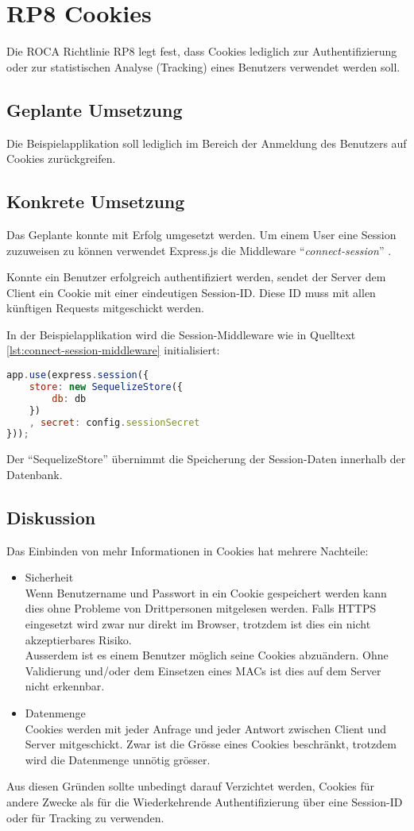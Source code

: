 \section{RP8 Cookies}
\label{sec:principle-rp8-cookies}
Die ROCA Richtlinie RP8 legt fest, dass Cookies lediglich zur Authentifizierung oder zur statistischen Analyse (Tracking) eines Benutzers verwendet werden soll.

\subsection*{Geplante Umsetzung}
Die Beispielapplikation soll lediglich im Bereich der Anmeldung des Benutzers auf Cookies zurückgreifen.

\subsection*{Konkrete Umsetzung}
Das Geplante konnte mit Erfolg umgesetzt werden.
Um einem User eine Session zuzuweisen zu können verwendet Express.js \cite{Expressjs} die \gls{Middleware} ``\emph{connect-session}'' \cite{ConnectSession}.

Konnte ein Benutzer erfolgreich authentifiziert werden, sendet der Server dem Client ein Cookie mit einer eindeutigen Session-ID. Diese ID muss mit allen künftigen Requests mitgeschickt werden.

In der Beispielapplikation wird die Session-Middleware wie in Quelltext \ref{lst:connect-session-middleware} initialisiert:

\begin{lstlisting}[language=JavaScript, caption=Connect Session Middleware \cite{RoomiesMiddlewareHttp}, label=lst:connect-session-middleware, firstnumber=31]
app.use(express.session({
	store: new SequelizeStore({
		db: db
	})
	, secret: config.sessionSecret
}));
\end{lstlisting}

Der ``SequelizeStore'' \cite{SequelizeStore} übernimmt die Speicherung der Session-Daten innerhalb der Datenbank.

\subsection*{Diskussion}
Das Einbinden von mehr Informationen in Cookies hat mehrere Nachteile:
\begin{itemize}
	\item Sicherheit \\
		Wenn Benutzername und Passwort in ein Cookie gespeichert werden kann dies ohne Probleme von Drittpersonen mitgelesen werden. Falls HTTPS eingesetzt wird zwar nur direkt im Browser, trotzdem ist dies ein nicht akzeptierbares Risiko. \\
		Ausserdem ist es einem Benutzer möglich seine Cookies abzuändern. Ohne Validierung und/oder dem Einsetzen eines \glspl{MAC} ist dies auf dem Server nicht erkennbar.
	\item Datenmenge \\
		Cookies werden mit jeder Anfrage und jeder Antwort zwischen Client und Server mitgeschickt. Zwar ist die Grösse eines Cookies beschränkt, trotzdem wird die Datenmenge unnötig grösser.
\end{itemize}

Aus diesen Gründen sollte unbedingt darauf Verzichtet werden, Cookies für andere Zwecke als für die Wiederkehrende Authentifizierung über eine Session-ID oder für Tracking zu verwenden.